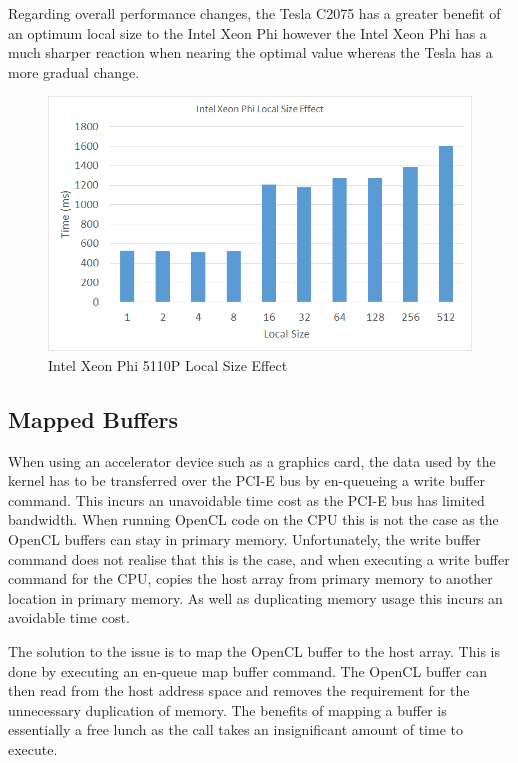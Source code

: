 Regarding overall performance changes, the Tesla C2075 has a greater benefit of
an optimum local size to the Intel Xeon Phi however the Intel Xeon Phi has a
much sharper reaction when nearing the optimal value whereas the Tesla has a
more gradual change.

\begin{figure}[H]
\includegraphics[width=\linewidth]{images/phiLocalSize.png}
\caption{Intel Xeon Phi 5110P Local Size Effect}
\label{fig:phiLocalSize}
\end{figure}

\subsection{Mapped Buffers}

When using an accelerator device such as a graphics card, the data used by the
kernel has to be transferred over the PCI-E bus by en-queueing a write buffer
command. This incurs an unavoidable time cost as the PCI-E bus has limited
bandwidth. When running OpenCL code on the CPU this is not the case as the
OpenCL buffers can stay in primary memory. Unfortunately, the write buffer
command does not realise that this is the case, and when executing a write
buffer command for the CPU, copies the host array from primary memory to another
location in primary memory. As well as duplicating memory usage this incurs an
avoidable time cost.

The solution to the issue is to map the OpenCL buffer to the host array. This is
done by executing an en-queue map buffer command. The OpenCL buffer can then
read from the host address space and removes the requirement for the unnecessary
duplication of memory. The benefits of mapping a buffer is essentially a free
lunch as the call takes an insignificant amount of time to execute.
